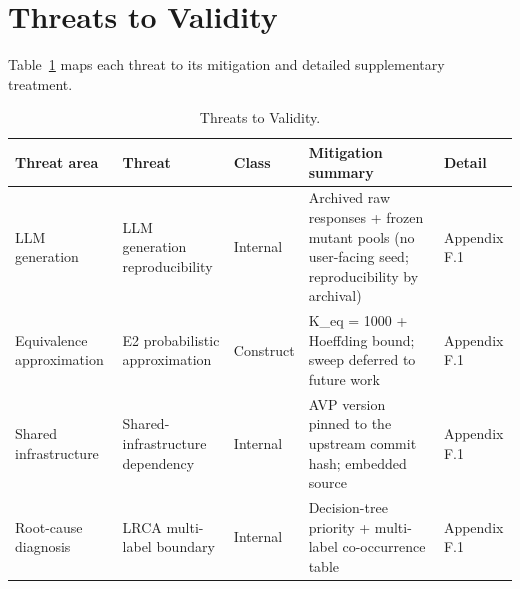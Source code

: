 \documentclass[manuscript,screen,review]{acmart}
\begin{document}

\section{Threats to Validity}\label{threats-to-validity}

Table~\ref{tab:p2-14} maps each threat to its mitigation and detailed
supplementary treatment.
{%
\begin{longtable}[]{@{}
  >{\raggedright\arraybackslash}p{}
  >{\raggedright\arraybackslash}p{}
  >{\raggedright\arraybackslash}p{}
  >{\raggedright\arraybackslash}p{}
  >{\raggedright\arraybackslash}p{}@{}}
\caption{Threats to Validity.}\label{tab:p2-14}\\
\toprule\noalign{}
\begin{minipage}[b]{\linewidth}\raggedright
Threat area
\end{minipage} & \begin{minipage}[b]{\linewidth}\raggedright
Threat
\end{minipage} & \begin{minipage}[b]{\linewidth}\raggedright
Class
\end{minipage} & \begin{minipage}[b]{\linewidth}\raggedright
Mitigation summary
\end{minipage} & \begin{minipage}[b]{\linewidth}\raggedright
Detail
\end{minipage} \\
\midrule\noalign{}
\endfirsthead
\endhead
\bottomrule\noalign{}
\endlastfoot
LLM generation & LLM generation reproducibility & Internal & Archived raw responses
+ frozen mutant pools (no user-facing seed; reproducibility by archival) & Appendix F.1 \\
Equivalence approximation & E2 probabilistic approximation & Construct & K\_eq = 1000 +
Hoeffding bound; sweep deferred to future work & Appendix F.1 \\
Shared infrastructure & Shared-infrastructure dependency & Internal & AVP version pinned to the upstream
commit hash; embedded source & Appendix F.1 \\
Root-cause diagnosis & LRCA multi-label boundary & Internal & Decision-tree priority +
multi-label co-occurrence table & Appendix F.1 \\

\end{longtable}}
\end{document}
